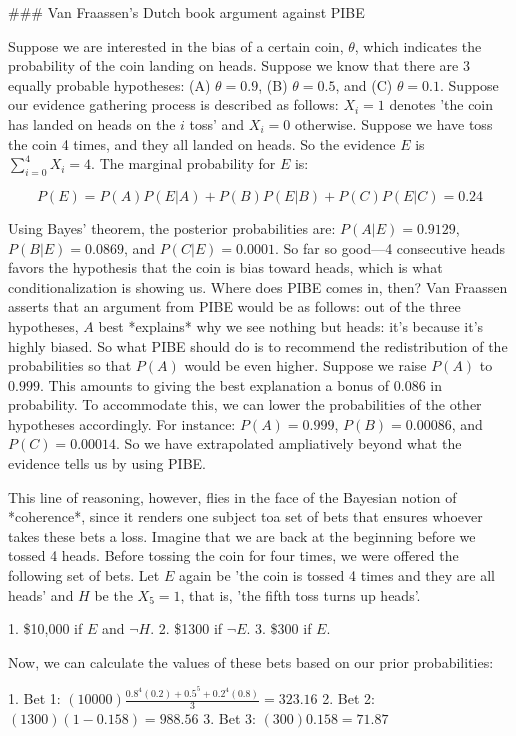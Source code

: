 \#\#\# Van Fraassen's Dutch book argument against PIBE

Suppose we are interested in the bias of a certain coin, \(\theta\),
which indicates the probability of the coin landing on heads. Suppose we
know that there are 3 equally probable hypotheses: (A) \(\theta = 0.9\),
(B) \(\theta = 0.5\), and (C) \(\theta = 0.1\). Suppose our evidence
gathering process is described as follows: \(X_i = 1\) denotes 'the coin
has landed on heads on the \(i\) toss' and \(X_i = 0\) otherwise.
Suppose we have toss the coin 4 times, and they all landed on heads. So
the evidence \(E\) is \(\sum_{i=0}^4 X_i = 4\). The marginal probability
for \(E\) is:

\[P(E) = P(A)P(E|A)+P(B)P(E|B)+P(C)P(E|C) = 0.24\]

Using Bayes' theorem, the posterior probabilities are:
\(P(A|E) = 0.9129\), \(P(B|E) = 0.0869\), and \(P(C|E) = 0.0001\). So
far so good---4 consecutive heads favors the hypothesis that the coin is
bias toward heads, which is what conditionalization is showing us. Where
does PIBE comes in, then? Van Fraassen asserts that an argument from
PIBE would be as follows: out of the three hypotheses, \(A\) best
*explains* why we see nothing but heads: it's because it's highly
biased. So what PIBE should do is to recommend the redistribution of the
probabilities so that \(P(A)\) would be even higher. Suppose we raise
\(P(A)\) to \(0.999\). This amounts to giving the best explanation a
bonus of \(0.086\) in probability. To accommodate this, we can lower the
probabilities of the other hypotheses accordingly. For instance:
\(P(A) = 0.999\), \(P(B) = 0.00086\), and \(P(C) = 0.00014\). So we have
extrapolated ampliatively beyond what the evidence tells us by using
PIBE.

This line of reasoning, however, flies in the face of the Bayesian
notion of *coherence*, since it renders one subject toa set of bets that
ensures whoever takes these bets a loss. Imagine that we are back at the
beginning before we tossed 4 heads. Before tossing the coin for four
times, we were offered the following set of bets. Let \(E\) again be
'the coin is tossed 4 times and they are all heads' and \(H\) be the
\(X_5=1\), that is, 'the fifth toss turns up heads'.

1. \$10,000 if \(E\) and \(\neg H\). 2. \$1300 if \(\neg E\). 3. \$300
if \(E\).

Now, we can calculate the values of these bets based on our prior
probabilities:

1. Bet 1:
\((10000)  \frac{0.8^4(0.2) + 0.5^5 + 0.2^4(0.8)}{3} = 323.16\) 2. Bet
2: \((1300)  (1-0.158) = 988.56\) 3. Bet 3: \((300)  0.158 = 71.87\)

